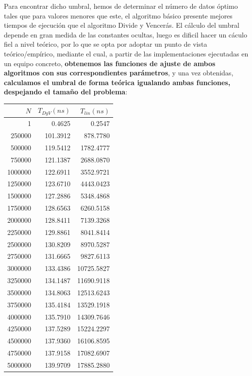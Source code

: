 Para encontrar dicho umbral, hemos de determinar el número de datos óptimo tales que para valores menores que este, el algoritmo básico 
presente mejores tiempos de ejecución que el algoritmo Divide y Vencerás. El cálculo del umbral depende en gran medida de las constantes ocultas, 
luego es dificil hacer un cáculo fiel a nivel teórico, por lo que se opta por adoptar un punto de vista teórico/empírico, mediante el cual, a partir de las 
implementaciones ejecutadas en un equipo concreto, \textbf{obtenemos las funciones de ajuste de ambos algoritmos con sus correspondientes 
parámetros}, y una vez obtenidas, \textbf{calculamos el umbral de forma teórica igualando ambas funciones, despejando el tamaño del problema}: 

\newpage

\begin{table}
	\footnotesize
	\centering
	\begin{tabular}{|r|r|r|}
		\hline
		$N$ & $T_{DyV} (ns)$ & $T_{lin} (ns)$ \\
		\hline
		1 & 0.4625 & 0.2547 \\ 
		250000 & 101.3912 & 878.7780 \\ 
		500000 & 119.5412 & 1782.4777 \\ 
		750000 & 121.1387 & 2688.0870 \\ 
		1000000 & 122.6911 & 3552.9721 \\ 
		1250000 & 123.6710 & 4443.0423 \\ 
		1500000 & 127.2886 & 5348.4868 \\ 
		1750000 & 128.6563 & 6260.5158 \\ 
		2000000 & 128.8411 & 7139.3268 \\ 
		2250000 & 129.8861 & 8041.8414 \\ 
		2500000 & 130.8209 & 8970.5287 \\ 
		2750000 & 131.6665 & 9827.6113 \\ 
		3000000 & 133.4386 & 10725.5827 \\ 
		3250000 & 134.1487 & 11690.9118 \\ 
		3500000 & 134.8063 & 12513.6243 \\ 
		3750000 & 135.4184 & 13529.1918 \\ 
		4000000 & 135.7910 & 14309.7646 \\ 
		4250000 & 137.5289 & 15224.2297 \\ 
		4500000 & 137.9360 & 16106.8595 \\ 
		4750000 & 137.9158 & 17082.6907 \\ 
		5000000 & 139.9709 & 17885.2880 \\ 

\end{tabular}
\end{table}
